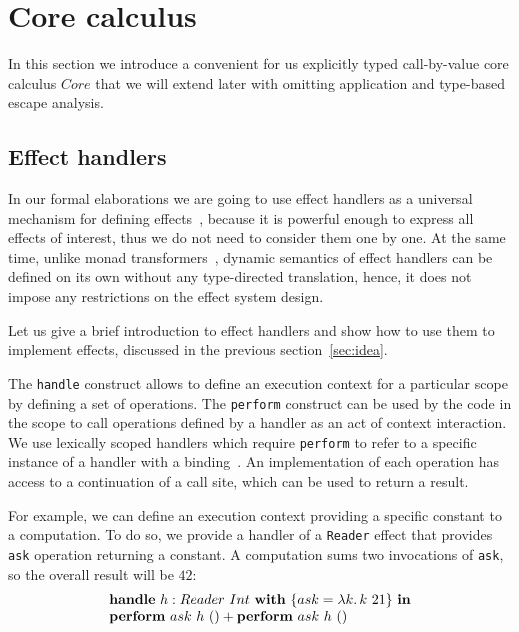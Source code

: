 \documentclass[acmsmall]{acmart}
\newcommand{\ap}{~}
\newcommand{\keyword}[1]{\mathbf{#1}}
\begin{document}
\section{Core calculus} \label{sec:core}

In this section we introduce a convenient for us explicitly typed call-by-value core calculus $Core$ that we will extend later with omitting application and type-based escape analysis.

\subsection{Effect handlers} \label{subsec:handlers}

In our formal elaborations we are going to use effect handlers as a universal mechanism for defining effects~\cite{plotkin2003algebraic, plotkin2013handling}, because it is powerful enough to express all effects of interest, thus we do not need to consider them one by one.
At the same time, unlike monad transformers~\cite{liang1995monad, schrijvers2019monad}, dynamic semantics of effect handlers can be defined on its own without any type-directed translation, hence, it does not impose any restrictions on the effect system design.

Let us give a brief introduction to effect handlers and show how to use them to implement effects, discussed in the previous section~\ref{sec:idea}.

The \texttt{handle} construct allows to define an execution context for a particular scope by defining a set of operations.
The \texttt{perform} construct can be used by the code in the scope to call operations defined by a handler as an act of context interaction.
We use lexically scoped handlers which require \texttt{perform} to refer to a specific instance of a handler with a binding~\cite{biernacki2019binders, brachthauser2020effects}.
An implementation of each operation has access to a continuation of a call site, which can be used to return a result.

For example, we can define an execution context providing a specific constant to a computation.
To do so, we provide a handler of a \texttt{Reader} effect that provides \texttt{ask} operation returning a constant.
A computation sums two invocations of \texttt{ask}, so the overall result will be $42$:
\[
    \begin{array}{l}
        \keyword{handle} ~ h : Reader\ap Int ~\keyword{with}~ \{ ask = \lambda k\ldotp k\ap 21 \} ~\keyword{in} \\
        \keyword{perform}~ask~h~() + \keyword{perform}~ask~h~()
    \end{array}
\]
\end{document}
